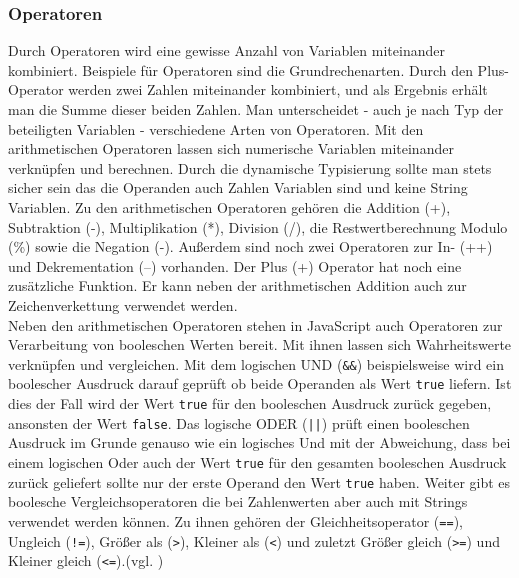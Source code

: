 \subsubsection{Operatoren} \glqq Durch Operatoren wird eine gewisse Anzahl von Variablen miteinander kombiniert. Beispiele für Operatoren sind die Grundrechenarten. Durch den Plus-Operator werden zwei Zahlen miteinander kombiniert, und als Ergebnis erhält man die Summe dieser beiden Zahlen. Man unterscheidet - auch je nach Typ der beteiligten Variablen - verschiedene Arten von Operatoren.\grqq{}\cite[S.69]{WenzJava2008} Mit den arithmetischen Operatoren lassen sich numerische Variablen miteinander verknüpfen und berechnen. Durch die dynamische Typisierung sollte man stets sicher sein das die Operanden auch Zahlen Variablen sind und keine String Variablen. Zu den arithmetischen Operatoren gehören die Addition (+), Subtraktion (-), Multiplikation (*), Division (/), die Restwertberechnung Modulo (\%) sowie die Negation (-). Außerdem sind noch zwei Operatoren zur In- (++) und Dekrementation (--) vorhanden. Der Plus (+) Operator hat noch eine zusätzliche Funktion. Er kann neben der arithmetischen Addition auch zur Zeichenverkettung verwendet werden.\\Neben den arithmetischen Operatoren stehen in JavaScript auch Operatoren zur Verarbeitung von booleschen Werten bereit. Mit ihnen lassen sich Wahrheitswerte verknüpfen und vergleichen. Mit dem logischen UND (\texttt{\&\&}) beispielsweise wird ein boolescher Ausdruck darauf geprüft ob beide Operanden als Wert \texttt{true} liefern. Ist dies der Fall wird der Wert \texttt{true} für den booleschen Ausdruck zurück gegeben, ansonsten der Wert \texttt{false}. Das logische ODER (\texttt{||}) prüft einen booleschen Ausdruck im Grunde genauso wie ein logisches Und mit der Abweichung, dass bei einem logischen Oder auch der Wert \texttt{true} für den gesamten booleschen Ausdruck zurück geliefert sollte nur der erste Operand den Wert \texttt{true} haben. Weiter gibt es boolesche Vergleichsoperatoren die bei Zahlenwerten aber auch mit Strings verwendet werden können. Zu ihnen gehören der Gleichheitsoperator (\texttt{==}), Ungleich (\texttt{!=}), Größer als (\texttt{\textgreater}), Kleiner als (\texttt{\textless}) und zuletzt Größer gleich (\texttt{\textgreater=}) und Kleiner gleich (\texttt{\textless=}).(vgl. \cite[S.71ff]{WenzJava2008})

